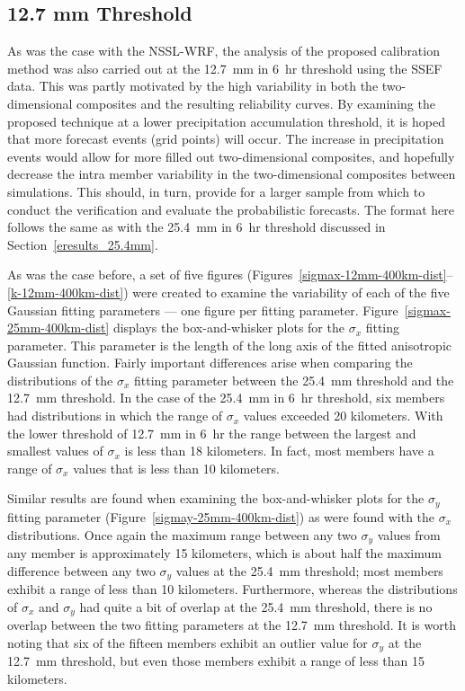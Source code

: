 \subsection{12.7 mm Threshold}
\label{eresults_12.7mm}

As was the case with the NSSL-WRF, the analysis of the proposed calibration method was also carried out at the \mbox{12.7 mm} in \mbox{6 hr} threshold using the SSEF data.
This was partly motivated by the high variability in both the two-dimensional composites and the resulting reliability curves.
By examining the proposed technique at a lower precipitation accumulation threshold, it is hoped that more forecast events (grid points) will occur.
The increase in precipitation events would allow for more filled out two-dimensional composites, and hopefully decrease the intra member variability in the two-dimensional composites between simulations.
This should, in turn, provide for a larger sample from which to conduct the verification and evaluate the probabilistic forecasts.
The format here follows the same as with the \mbox{25.4 mm} in \mbox{6 hr} threshold discussed in \mbox{Section \ref{eresults_25.4mm}}.


As was the case before, a set of five figures (\mbox{Figures \ref{sigmax-12mm-400km-dist}--\ref{k-12mm-400km-dist}}) were created to examine the variability of each of the five Gaussian fitting parameters --- one figure per fitting parameter.
\mbox{Figure \ref{sigmax-25mm-400km-dist}} displays the box-and-whisker plots for the $\sigma_x$ fitting parameter.
This parameter is the length of the long axis of the fitted anisotropic Gaussian function.
Fairly important differences arise when comparing the distributions of the $\sigma_x$ fitting parameter between the \mbox{25.4 mm} threshold and the \mbox{12.7 mm} threshold.
In the case of the \mbox{25.4 mm} in \mbox{6 hr} threshold, six members had distributions in which the range of $\sigma_x$ values exceeded 20 kilometers.
With the lower threshold of \mbox{12.7 mm} in \mbox{6 hr} the range between the largest and smallest values of $\sigma_x$ is less than 18 kilometers.
In fact, most members have a range of $\sigma_x$ values that is less than 10 kilometers.


Similar results are found when examining the box-and-whisker plots for the $\sigma_y$ fitting parameter (\mbox{Figure \ref{sigmay-25mm-400km-dist}}) as were found with the $\sigma_x$ distributions.
Once again the maximum range between any two $\sigma_y$ values from any member is approximately 15 kilometers, which is about half the maximum difference between any two $\sigma_y$ values at the \mbox{25.4 mm} threshold; most members exhibit a range of less than 10 kilometers.
Furthermore, whereas the distributions of $\sigma_x$ and $\sigma_y$ had quite a bit of overlap at the \mbox{25.4 mm} threshold, there is no overlap between the two fitting parameters at the \mbox{12.7 mm} threshold.
It is worth noting that six of the fifteen members exhibit an outlier value for $\sigma_y$ at the \mbox{12.7 mm} threshold, but even those members exhibit a range of less than 15 kilometers.


